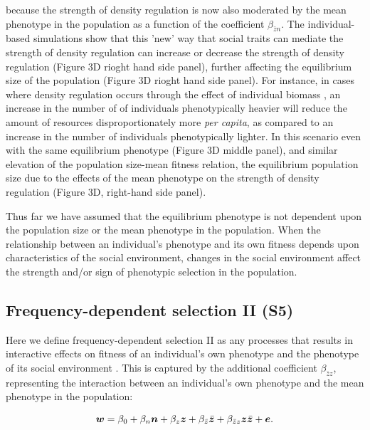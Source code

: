 \documentclass{article}
\begin{document}
\noindent because the strength of density regulation is now also moderated by the mean phenotype in the population as a function of the coefficient  $\beta_{\bar{z}n}$. The individual-based simulations show that this 'new' way that social traits can mediate the strength of density regulation can increase or decrease the strength of density regulation (Figure 3D rioght hand side panel), further affecting the equilibrium size of the population (Figure 3D rioght hand side panel). For instance, in cases where density regulation occurs through the effect of individual biomass \citep{Owen-Smith2002}, an increase in the number of of individuals phenotypically heavier will reduce the amount of resources disproportionately more \textit{per capita}, as compared to an increase in the number of individuals phenotypically lighter. In this scenario even with the same equilibrium phenotype (Figure 3D middle panel), and similar elevation of the population size-mean fitness relation, the equilibrium population size due to the effects of the mean phenotype on the strength of density regulation (Figure 3D, right-hand side panel). 

Thus far we have assumed that the equilibrium phenotype is not dependent upon the population size or the mean phenotype in the population. When the relationship between an individual's phenotype and its own fitness depends upon characteristics of the social environment, changes in the social environment affect the strength and/or sign of phenotypic selection in the population. 
 
 
\subsection{Frequency-dependent selection II (S5)}

 Here we define frequency-dependent selection II as any processes that results in interactive effects on fitness of an individual's own phenotype and the phenotype of its social environment \citep{Araya-Ajoy2020}. This is captured by the additional coefficient $\beta_{\bar{z}z}$, representing the interaction between an individual's own phenotype and the mean phenotype in the population:  

\begin{equation} \label{eq: FDS}
\vectorsym{w}=\beta_{0} +\beta_{n} \vectorsym{n} + \beta_{z} \vectorsym{z}+ \beta_{\bar{z}} \vectorsym{\bar{z}}  + \beta_{\bar{z}z} \vectorsym{z\bar{z}}  +  \vectorsym{e}.
\end{equation}
\end{document}
